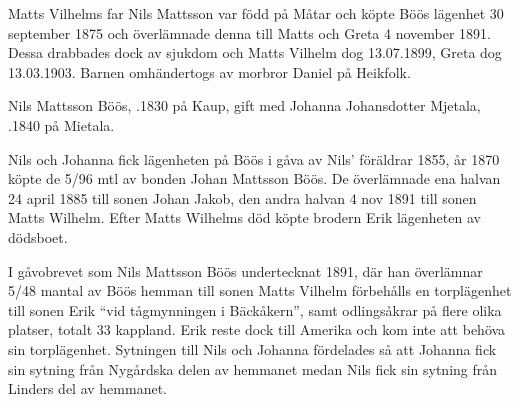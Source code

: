 Matts Vilhelms far Nils Mattsson var född på Måtar och köpte Böös lägenhet 30 september 1875 och överlämnade denna till Matts och Greta 4 november 1891. Dessa drabbades dock av sjukdom och Matts Vilhelm dog 13.07.1899, Greta dog 13.03.1903. Barnen omhändertogs av morbror Daniel på Heikfolk.


Nils Mattsson Böös, .1830 på Kaup, gift med  Johanna Johansdotter Mjetala, .1840 på Mietala.
\begin{jhchildren}
  \item {}
  \item {}
  \item {}
  \item {}
  \item {}
  \item {}
  \item {}
  \item {}
  \item {}
  \item {}
  \item {}
  \item {}
\end{jhchildren}

Nils och Johanna fick lägenheten på Böös i gåva av Nils' föräldrar 1855, år 1870 köpte de 5/96 mtl av bonden Johan Mattsson Böös. De överlämnade ena halvan 24 april 1885 till sonen Johan Jakob, den andra halvan 4 nov 1891 till sonen Matts Wilhelm. Efter Matts Wilhelms död köpte brodern Erik lägenheten av dödsboet.

I gåvobrevet som Nils Mattsson Böös undertecknat 1891, där han överlämnar 5/48 mantal av Böös hemman till sonen Matts Vilhelm förbehålls en torplägenhet till sonen Erik ``vid tågmynningen i Bäckåkern'', samt odlingsåkrar på flere olika platser, totalt 33 kappland. Erik reste dock till Amerika och kom inte att behöva sin torplägenhet. Sytningen till Nils och Johanna fördelades så att Johanna fick sin sytning från Nygårdska delen av hemmanet medan Nils fick sin sytning från Linders del av hemmanet.

